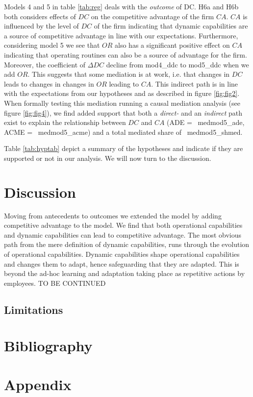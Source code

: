 \documentclass[review,fleqn]{elsarticle}\usepackage[]{graphicx}\usepackage[]{color}
\begin{document}
Models 4 and 5 in table \ref{tab:reg} deals with the \emph{outcome} of DC. H6a and H6b
both considers effects of $DC$ on the competitive advantage of the firm $CA$. $CA$ is
influenced by the level of $DC$ of the firm indicating that dynamic capabilities are a
source of competitive advantage in line with our expectations. Furthermore, considering
model 5 we see that $OR$ also has a significant positive effect on $CA$ indicating that
operating routines can also be a source of advantage for the firm. Moreover, the
coefficient of $\Delta DC$ decline from  {mod4_ddc} to  {mod5_ddc} when we add
$OR$. This suggests that some mediation is at work, i.e. that changes in $DC$ leads to
changes in changes in $OR$ leading to $CA$. This indirect path is in line with the
expectations from our hypotheses and as described in figure \ref{fig:fig2}. When formally
testing this mediation running a causal mediation analysis (see figure \ref{fig:fig4}), we
find added support that both a \emph{direct-} and an \emph{indirect} path exist to explain
the relationship between $DC$ and $CA$ (ADE = \ {medmod5_ade}, ACME =
\ {medmod5_acme}) and a total mediated share of \ {medmod5_shmed}.

Table \ref{tab:hyptab} depict a summary of the hypotheses and indicate if they are
supported or not in our analysis. We will now turn to the discussion.



\section{Discussion}


Moving from antecedents to outcomes we extended the \cite{Zollo2002a} model by adding
competitive advantage to the model. We find that both operational capabilities and dynamic
capabilities can lead to competitive advantage. The most obvious path from the mere
definition of dynamic capabilities, runs through the evolution of operational
capabilities. Dynamic capabilities shape operational capabilities and changes them to
adapt, hence safeguarding that they are adapted. This is beyond the ad-hoc learning and
adaptation taking place as repetitive actions by employees. TO BE CONTINUED

\subsection{Limitations}









\section{Bibliography}


\singlespacing




\section{Appendix}
\end{document}
